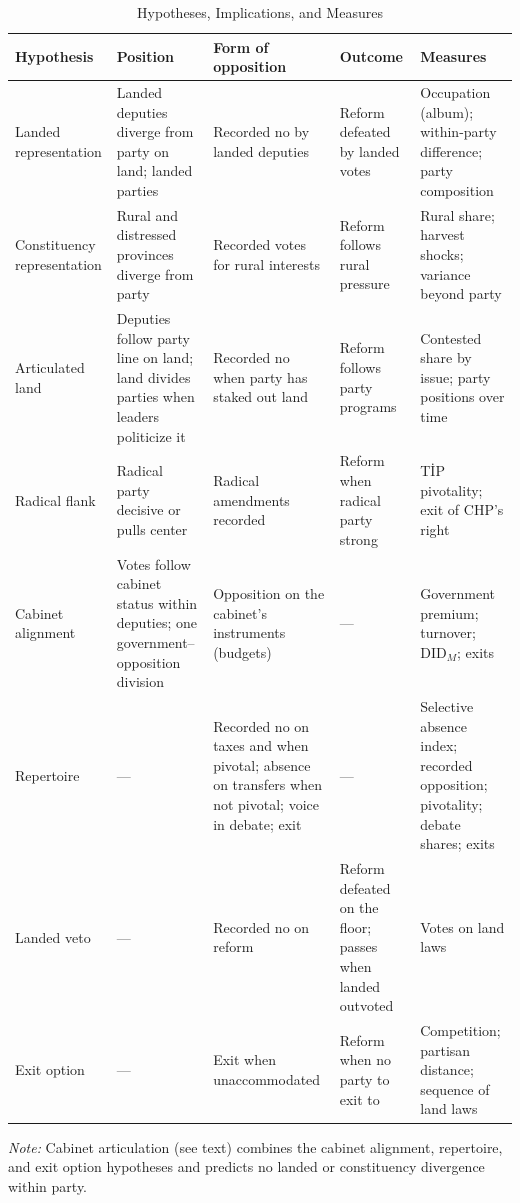 \documentclass[12pt]{article}
\begin{document}
\begin{table}[p]
\centering
\begin{threeparttable}
\caption{Hypotheses, Implications, and Measures}
\label{tab:hyp}
\footnotesize
\begin{tabular}{L{2.3cm}L{3.5cm}L{3.4cm}L{2.9cm}L{3.9cm}}
\toprule
Hypothesis & Position & Form of opposition & Outcome & Measures \\
\midrule
Landed representation & Landed deputies diverge from party on land; landed parties & Recorded no by landed deputies & Reform defeated by landed votes & Occupation (album); within-party difference; party composition \\
Constituency representation & Rural and distressed provinces diverge from party & Recorded votes for rural interests & Reform follows rural pressure & Rural share; harvest shocks; variance beyond party \\
Articulated land & Deputies follow party line on land; land divides parties when leaders politicize it & Recorded no when party has staked out land & Reform follows party programs & Contested share by issue; party positions over time \\
Radical flank & Radical party decisive or pulls center & Radical amendments recorded & Reform when radical party strong & TİP pivotality; exit of CHP's right \\
Cabinet alignment & Votes follow cabinet status within deputies; one government--opposition division & Opposition on the cabinet's instruments (budgets) & --- & Government premium; turnover; DID$_M$; exits \\
Repertoire & --- & Recorded no on taxes and when pivotal; absence on transfers when not pivotal; voice in debate; exit & --- & Selective absence index; recorded opposition; pivotality; debate shares; exits \\
Landed veto & --- & Recorded no on reform & Reform defeated on the floor; passes when landed outvoted & Votes on land laws \\
Exit option & --- & Exit when unaccommodated & Reform when no party to exit to & Competition; partisan distance; sequence of land laws \\
\bottomrule
\end{tabular}
\begin{tablenotes}\footnotesize
\item \textit{Note:} Cabinet articulation (see text) combines the cabinet alignment, repertoire, and exit option hypotheses and predicts no landed or constituency divergence within party.
\end{tablenotes}
\end{threeparttable}
\end{table}
\end{document}
